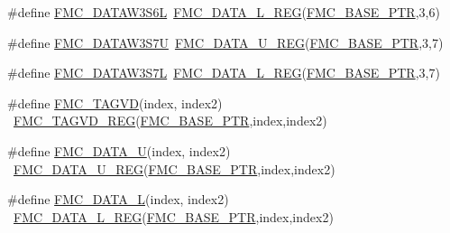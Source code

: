 \begin{DoxyCompactItemize}
\item 
\#define \hyperlink{group___f_m_c___register___accessor___macros_gad182823ce16886d4c4c04606ffff41d3}{F\+M\+C\+\_\+\+D\+A\+T\+A\+W3\+S6L}~\hyperlink{group___f_m_c___register___accessor___macros_ga4a86395060ba1ded814dbe8cc6eb0e8c}{F\+M\+C\+\_\+\+D\+A\+T\+A\+\_\+\+L\+\_\+\+R\+EG}(\hyperlink{group___f_m_c___peripheral_ga0a740437b573e32e6b932bf729485fd9}{F\+M\+C\+\_\+\+B\+A\+S\+E\+\_\+\+P\+TR},3,6)
\item 
\#define \hyperlink{group___f_m_c___register___accessor___macros_ga7cc447210b46ec7af986d8e07b308458}{F\+M\+C\+\_\+\+D\+A\+T\+A\+W3\+S7U}~\hyperlink{group___f_m_c___register___accessor___macros_ga77e953c0a13be535a400b4fce86c0601}{F\+M\+C\+\_\+\+D\+A\+T\+A\+\_\+\+U\+\_\+\+R\+EG}(\hyperlink{group___f_m_c___peripheral_ga0a740437b573e32e6b932bf729485fd9}{F\+M\+C\+\_\+\+B\+A\+S\+E\+\_\+\+P\+TR},3,7)
\item 
\#define \hyperlink{group___f_m_c___register___accessor___macros_gade0c0cc74a0369065c0bfe3ab9dcc130}{F\+M\+C\+\_\+\+D\+A\+T\+A\+W3\+S7L}~\hyperlink{group___f_m_c___register___accessor___macros_ga4a86395060ba1ded814dbe8cc6eb0e8c}{F\+M\+C\+\_\+\+D\+A\+T\+A\+\_\+\+L\+\_\+\+R\+EG}(\hyperlink{group___f_m_c___peripheral_ga0a740437b573e32e6b932bf729485fd9}{F\+M\+C\+\_\+\+B\+A\+S\+E\+\_\+\+P\+TR},3,7)
\item 
\#define \hyperlink{group___f_m_c___register___accessor___macros_ga26f85925aef70f6e17960b39e8cf4cbf}{F\+M\+C\+\_\+\+T\+A\+G\+VD}(index,  index2)                                ~\hyperlink{group___f_m_c___register___accessor___macros_ga69adb2f34bbe33d04c2075cee0e7d5f4}{F\+M\+C\+\_\+\+T\+A\+G\+V\+D\+\_\+\+R\+EG}(\hyperlink{group___f_m_c___peripheral_ga0a740437b573e32e6b932bf729485fd9}{F\+M\+C\+\_\+\+B\+A\+S\+E\+\_\+\+P\+TR},index,index2)
\item 
\#define \hyperlink{group___f_m_c___register___accessor___macros_ga1adb60730dd146af0cc2bc261a312630}{F\+M\+C\+\_\+\+D\+A\+T\+A\+\_\+U}(index,  index2)                              ~\hyperlink{group___f_m_c___register___accessor___macros_ga77e953c0a13be535a400b4fce86c0601}{F\+M\+C\+\_\+\+D\+A\+T\+A\+\_\+\+U\+\_\+\+R\+EG}(\hyperlink{group___f_m_c___peripheral_ga0a740437b573e32e6b932bf729485fd9}{F\+M\+C\+\_\+\+B\+A\+S\+E\+\_\+\+P\+TR},index,index2)
\item 
\#define \hyperlink{group___f_m_c___register___accessor___macros_gaac99bb7cb52088a4b086e2967c353743}{F\+M\+C\+\_\+\+D\+A\+T\+A\+\_\+L}(index,  index2)                              ~\hyperlink{group___f_m_c___register___accessor___macros_ga4a86395060ba1ded814dbe8cc6eb0e8c}{F\+M\+C\+\_\+\+D\+A\+T\+A\+\_\+\+L\+\_\+\+R\+EG}(\hyperlink{group___f_m_c___peripheral_ga0a740437b573e32e6b932bf729485fd9}{F\+M\+C\+\_\+\+B\+A\+S\+E\+\_\+\+P\+TR},index,index2)

\end{DoxyCompactItemize}
